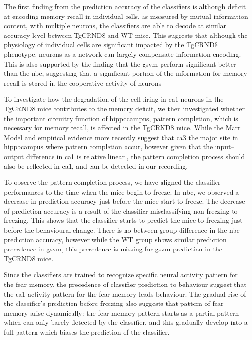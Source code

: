 The first finding from the prediction accuracy of the classifiers is although deficit at encoding memory recall in individual cells, as measured by mutual information content, with multiple neurons, the classifiers are able to decode at similar accuracy level between TgCRND8 and WT mice. This suggests that although the physiology of individual cells are significant impacted by the TgCRND8 phenotype, neurons as a network can largely compensate information encoding. This is also supported by the finding that the \gls{gsvm} perform significant better than the \gls{nbc}, suggesting that a significant portion of the information for memory recall is stored in the cooperative activity of neurons. 

To investigate how the degradation of the cell firing in \gls{ca1} neurons in the TgCRND8 mice contributes to the memory deficit, we then investigated whether the important circuitry function of hippocampus, pattern completion, which is necessary for memory recall, is affected in the TgCRND8 mice. While the Marr Model and empirical evidence more recently \citep{rolls13, neunuebel14} suggest that \gls{ca3} the major site in hippocampus where pattern completion occur, however given that the input--output difference in \gls{ca1} is relative linear \citep{neunuebel14, knierim16}, the pattern completion process should also be reflected in \gls{ca1}, and can be detected in our recording. 

To observe the pattern completion process, we have aligned the classifier performances to the time when the mice begin to freeze. In \gls{nbc}, we observed a decrease in prediction accuracy just before the mice start to freeze. The decrease of prediction accuracy is a result of the classifier misclassifying non-freezing to freezing. This shows that the classifier starts to predict the mice to freezing just before the behavioural change. There is no between-group difference in the \gls{nbc} prediction accuracy, however while the WT group shows similar prediction precedence in \gls{gsvm}, this precedence is missing for \gls{gsvm} prediction in the TgCRND8 mice. 

Since the classifiers are trained to recognize specific neural activity pattern for the fear memory, the precedence of classifier prediction to behaviour suggest that the \gls{ca1} activity pattern for the fear memory leads behaviour. The gradual rise of the classifier's prediction before freezing also suggests that pattern of fear memory arise dynamically: the fear memory pattern starts as a partial pattern which can only barely detected by the classifier, and this gradually develop into a full pattern which biases the prediction of the classifier. 

